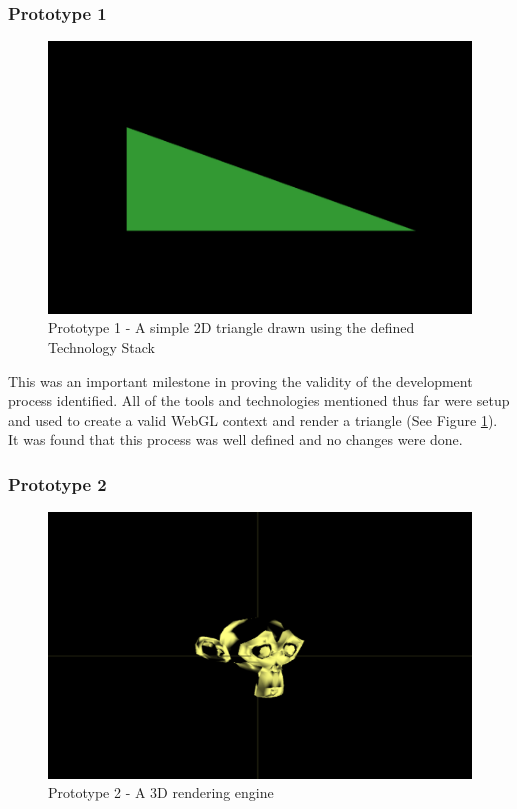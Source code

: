 \subsubsection {Prototype 1}
\begin{figure}[h]
    \centering
    \includegraphics[width=1\columnwidth]{author-files/figures/tri.png}
    \caption{Prototype 1 - A simple 2D triangle drawn using the defined Technology Stack}
    \label{fig:prototype1}
\end{figure}

This was an important milestone in proving the validity of the development process identified. All of the tools and technologies mentioned thus far were setup and used to create a valid WebGL context and render a triangle (See Figure \ref{fig:prototype1}). It was found that this process was well defined and no changes were done.

\subsubsection {Prototype 2} \label{prototype2}
\begin{figure}[h]
    \centering
    \includegraphics[width=1\columnwidth]{author-files/figures/Monkey-Test2.png}
    \caption{Prototype 2 - A 3D rendering engine}
    \label{fig:Monkey}
\end{figure}

